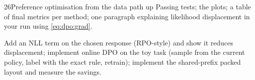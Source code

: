 \begin{labbox}{26}{Preference optimisation from the data path up}
Passing tests; the plots; a table of final metrics per method; one paragraph explaining
likelihood displacement in your run using \eqref{eq:dpo:grad}.

Add an NLL term on the chosen response (RPO-style) and show it reduces displacement; implement
online DPO on the toy task (sample from the current policy, label with the exact rule, retrain);
implement the shared-prefix packed layout and measure the savings.
\end{labbox}

